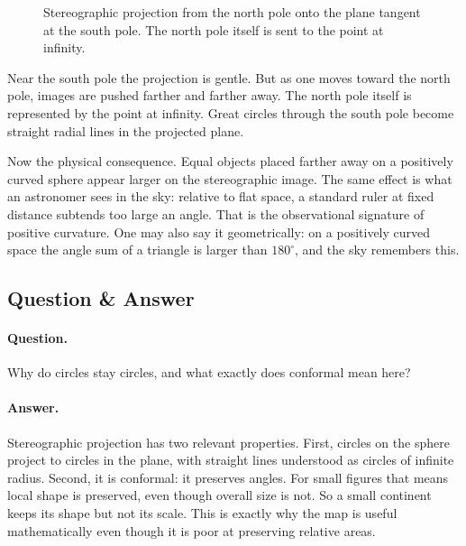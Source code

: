 \begin{figure}[htbp]
\centering
{}
\caption{Stereographic projection from the north pole onto the plane tangent at the south pole. The north pole itself is sent to the point at infinity.}
\end{figure}

Near the south pole the projection is gentle. But as one moves toward the north pole, images are pushed farther and farther away. The north pole itself is represented by the point at infinity. Great circles through the south pole become straight radial lines in the projected plane.

Now the physical consequence. Equal objects placed farther away on a positively curved sphere appear larger on the stereographic image. The same effect is what an astronomer sees in the sky: relative to flat space, a standard ruler at fixed distance subtends too large an angle. That is the observational signature of positive curvature. One may also say it geometrically: on a positively curved space the angle sum of a triangle is larger than \(180^\circ\), and the sky remembers this.

\subsection{Question \& Answer}

\paragraph{Question.} Why do circles stay circles, and what exactly does conformal mean here?

\paragraph{Answer.} Stereographic projection has two relevant properties. First, circles on the sphere project to circles in the plane, with straight lines understood as circles of infinite radius. Second, it is conformal: it preserves angles. For small figures that means local shape is preserved, even though overall size is not. So a small continent keeps its shape but not its scale. This is exactly why the map is useful mathematically even though it is poor at preserving relative areas.

